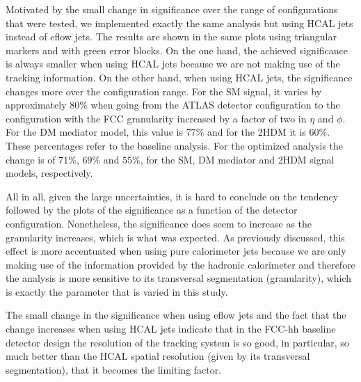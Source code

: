 Motivated by the small change in significance over the range of configurations that were tested, we implemented exactly the same analysis but using HCAL jets instead of eflow jets. The results are shown in the same plots using triangular markers and with green error blocks. On the one hand, the achieved significance is always smaller when using HCAL jets because we are not making use of the tracking information. On the other hand, when using HCAL jets, the significance changes more over the configuration range. For the SM signal, it varies by approximately $80\%$ when going from the ATLAS detector configuration to the configuration with the FCC granularity increased by a factor of two in $\eta$ and $\phi$. For the DM mediator model, this value is $77\%$ and for the 2HDM it is $60\%$. These percentages refer to the baseline analysis. For the optimized analysis the change is of $71\%$, $69\%$ and $55\%$, for the SM, DM mediator and 2HDM signal models, respectively.

All in all, given the large uncertainties, it is hard to conclude on the tendency followed by the plots of the significance as a function of the detector configuration. Nonetheless, the significance does seem to increase as the granularity increases, which is what was expected. As previously discussed, this effect is more accentuated when using pure calorimeter jets because we are only making use of the information provided by the hadronic calorimeter and therefore the analysis is more sensitive to its transversal segmentation (granularity), which is exactly the parameter that is varied in this study.

The small change in the significance when using eflow jets and the fact that the change increases when using HCAL jets indicate that in the FCC-hh baseline detector design the resolution of the tracking system is so good, in particular, so much better than the HCAL spatial resolution (given by its transversal segmentation), that it becomes the limiting factor.

